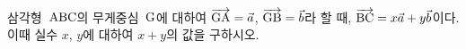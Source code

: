 삼각형~$\mathrm{ABC}$의 무게중심~$\mathrm{G}$에 대하여 $\overrightarrow{\mathrm{GA}}=\vec{a}$, $\overrightarrow{\mathrm{GB}}=\vec{b}$라 할 때, $\overrightarrow{\mathrm{BC}}=x\vec{a}+y\vec{b}$이다. 이때 실수 $x$, $y$에 대하여 $x+y$의 값을 구하시오.
